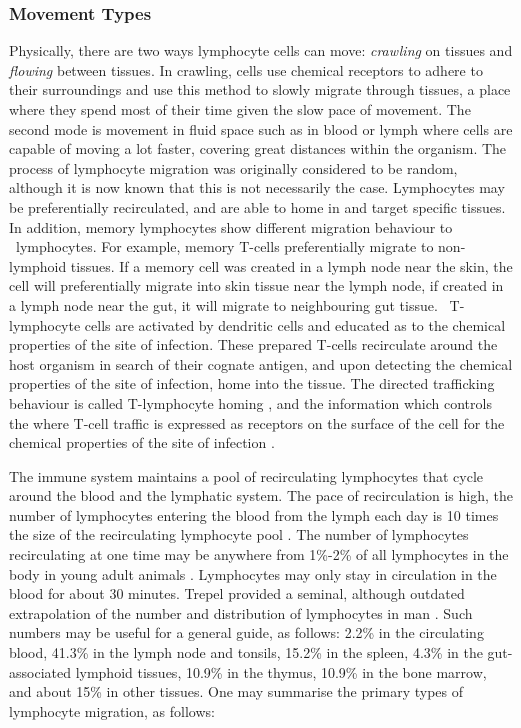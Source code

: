 %
%
\subsubsection{Movement Types}
\label{subsubsec:tissues:migration:mobility:movement}
Physically, there are two ways lymphocyte cells can move: \emph{crawling} on tissues and \emph{flowing} between tissues. In crawling, cells use chemical receptors to adhere to their surroundings and use this method to slowly migrate through tissues, a place where they spend most of their time given the slow pace of movement. The second mode is movement in fluid space such as in blood or lymph where cells are capable of moving a lot faster, covering great distances within the organism. The process of lymphocyte migration was originally considered to be random, although it is now known that this is not necessarily the case. Lymphocytes may be preferentially recirculated, and are able to home in and target specific tissues. In addition, memory lymphocytes show different migration behaviour to \naive\ lymphocytes. For example, memory T-cells preferentially migrate to non-lymphoid tissues. If a memory cell was created in a lymph node near the skin, the cell will preferentially migrate into skin tissue near the lymph node, if created in a lymph node near the gut, it will migrate to neighbouring gut tissue. \Naive\ T-lymphocyte cells are activated by dendritic cells and educated as to the chemical properties of the site of infection. These prepared T-cells recirculate around the host organism in search of their cognate antigen, and upon detecting the chemical properties of the site of infection, home into the tissue. The directed trafficking behaviour is called T-lymphocyte homing \cite{Butcher1999, Butcher1996, Picker1992, Warnock1998}, and the information which controls the where T-cell traffic is expressed as receptors on the surface of the cell for the chemical properties of the site of infection \cite{Ferber2007, Salmi2005}. 

The immune system maintains a pool of recirculating lymphocytes that cycle around the blood and the lymphatic system. The pace of recirculation is high, the number of lymphocytes entering the blood from the lymph each day is 10 times the size of the recirculating lymphocyte pool \cite{Anderson1990a}. The number of lymphocytes recirculating at one time may be anywhere from 1\%-2\% of all lymphocytes in the body in young adult animals \cite{Young1999a, Stekel1997}. Lymphocytes may only stay in circulation in the blood for about 30 minutes. Trepel provided a seminal, although outdated extrapolation of the number and distribution of lymphocytes in man \cite{Trepel1974}. Such numbers may be useful for a general guide, as follows: 2.2\% in the circulating blood, 41.3\% in the lymph node and tonsils, 15.2\% in the spleen, 4.3\% in the gut-associated lymphoid tissues, 10.9\% in the thymus, 10.9\% in the bone marrow, and about 15\% in other tissues. One may summarise the primary types of lymphocyte migration, as follows:

